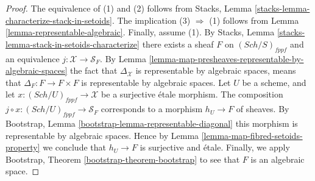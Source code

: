 \documentclass{stacks-project}
\theoremstyle{plain}
\theoremstyle{definition}
\theoremstyle{remark}
\numberwithin{equation}{subsection}
\def\Sch{\mathit{Sch}}
\begin{document}
\begin{proof}
The equivalence of (1) and (2) follows from
Stacks, Lemma \ref{stacks-lemma-characterize-stack-in-setoids}.
The implication (3) $\Rightarrow$ (1) follows from
Lemma \ref{lemma-representable-algebraic}.
Finally, assume (1). By
Stacks, Lemma \ref{stacks-lemma-stack-in-setoids-characterize}
there exists a sheaf $F$ on $(\Sch/S)_{fppf}$
and an equivalence $j : \mathcal{X} \to \mathcal{S}_F$. By
Lemma \ref{lemma-map-presheaves-representable-by-algebraic-spaces}
the fact that $\Delta_\mathcal{X}$ is representable by algebraic
spaces, means that $\Delta_F : F \to F \times F$
is representable by algebraic spaces.
Let $U$ be a scheme, and let $x : (\Sch/U)_{fppf} \to \mathcal{X}$
be a surjective \'etale morphism. The composition
$j \circ x : (\Sch/U)_{fppf} \to \mathcal{S}_F$
corresponds to a morphism $h_U \to F$ of sheaves. By
Bootstrap, Lemma \ref{bootstrap-lemma-representable-diagonal}
this morphism is representable by algebraic spaces.
Hence by
Lemma \ref{lemma-map-fibred-setoids-property}
we conclude that $h_U \to F$ is surjective and \'etale.
Finally, we apply
Bootstrap, Theorem \ref{bootstrap-theorem-bootstrap}
to see that $F$ is an algebraic space.
\end{proof}
\end{document}
